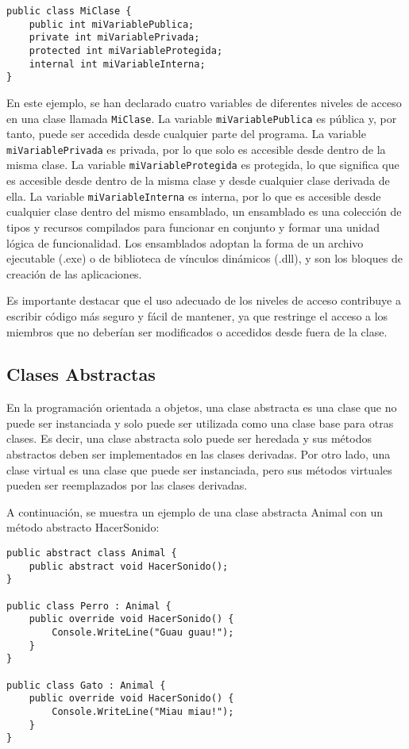 \documentclass[executivepaper]{article}
\begin{document}
\begin{lstlisting}
public class MiClase {
    public int miVariablePublica;
    private int miVariablePrivada;
    protected int miVariableProtegida;
    internal int miVariableInterna;
}
\end{lstlisting}

En este ejemplo, se han declarado cuatro variables de diferentes niveles de acceso en una clase llamada \texttt{MiClase}. La variable \texttt{miVariablePublica} es pública y, por tanto, puede ser accedida desde cualquier parte del programa. La variable \texttt{miVariablePrivada} es privada, por lo que solo es accesible desde dentro de la misma clase. La variable \texttt{miVariableProtegida} es protegida, lo que significa que es accesible desde dentro de la misma clase y desde cualquier clase derivada de ella. La variable \texttt{miVariableInterna} es interna, por lo que es accesible desde cualquier clase dentro del mismo ensamblado, un ensamblado es una colección de tipos y recursos compilados para funcionar en conjunto y formar una unidad lógica de funcionalidad. Los ensamblados adoptan la forma de un archivo ejecutable (.exe) o de biblioteca de vínculos dinámicos (.dll), y son los bloques de creación de las aplicaciones.

Es importante destacar que el uso adecuado de los niveles de acceso contribuye a escribir código más seguro y fácil de mantener, ya que restringe el acceso a los miembros que no deberían ser modificados o accedidos desde fuera de la clase.

\subsection{Clases Abstractas}

En la programación orientada a objetos, una clase abstracta es una clase que no puede ser instanciada y solo puede ser utilizada como una clase base para otras clases. Es decir, una clase abstracta solo puede ser heredada y sus métodos abstractos deben ser implementados en las clases derivadas. Por otro lado, una clase virtual es una clase que puede ser instanciada, pero sus métodos virtuales pueden ser reemplazados por las clases derivadas.

A continuación, se muestra un ejemplo de una clase abstracta Animal con un método abstracto HacerSonido:

\begin{lstlisting}
public abstract class Animal {
    public abstract void HacerSonido();
}

public class Perro : Animal {
    public override void HacerSonido() {
        Console.WriteLine("Guau guau!");
    }
}

public class Gato : Animal {
    public override void HacerSonido() {
        Console.WriteLine("Miau miau!");
    }
}
\end{lstlisting}
\end{document}
